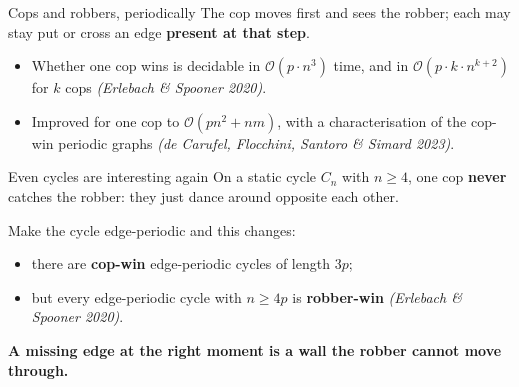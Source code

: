 \documentclass[10pt, compress]{beamer}
\begin{document}
\begin{frame}{Cops and robbers, periodically}
The cop moves first and sees the robber; each may stay put or cross an edge \textbf{present at that step}.

\bigskip

\begin{itemize}
\item Whether one cop wins is decidable in $\mathcal{O}(p \cdot n^3)$ time, and in $\mathcal{O}(p \cdot k \cdot n^{k+2})$ for $k$ cops \textit{(Erlebach \& Spooner 2020)}.
\bigskip
\item Improved for one cop to $\mathcal{O}(p n^2 + nm)$, with a characterisation of the cop-win periodic graphs \textit{(de Carufel, Flocchini, Santoro \& Simard 2023)}.
\end{itemize}

\bigskip

\end{frame}






\begin{frame}{Even cycles are interesting again}
On a static cycle $C_n$ with $n \geq 4$, one cop \textbf{never} catches the robber: they just dance around opposite each other.

\bigskip

Make the cycle edge-periodic and this changes:

\begin{itemize}
\item there are \textbf{cop-win} edge-periodic cycles of length $3p$;
\item but every edge-periodic cycle with $n \geq 4p$ is \textbf{robber-win} \textit{(Erlebach \& Spooner 2020)}.
\end{itemize}

\bigskip

\textbf{A missing edge at the right moment is a wall the robber cannot move through.}
\end{frame}
\end{document}
